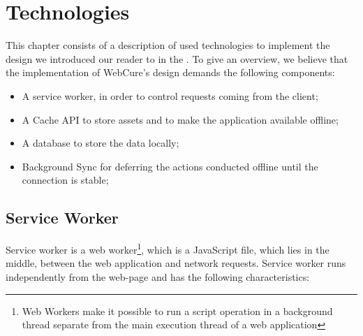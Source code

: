 \chapter{Technologies}
\label{Technologies}

This chapter consists of a description of used technologies to implement the design we introduced our reader to in the . To give an overview, we believe that the implementation of WebCure's design demands the following components:

\begin{itemize}
\item{A service worker, in order to control requests coming from the client;}
\item{A Cache API to store assets and to make the application available offline;}
\item{A database to store the data locally;}
\item{Background Sync for deferring the actions conducted offline until the connection is stable;}

\end{itemize}

\section{Service Worker}

Service worker\cite{1} is a web worker\footnote{Web Workers make it possible to run a script operation in a background thread separate from the main execution thread of a web application\cite{30}}, which is a JavaScript file, which lies in the middle, between the web application and network requests. Service worker runs independently from the web-page and has the following characteristics: 

